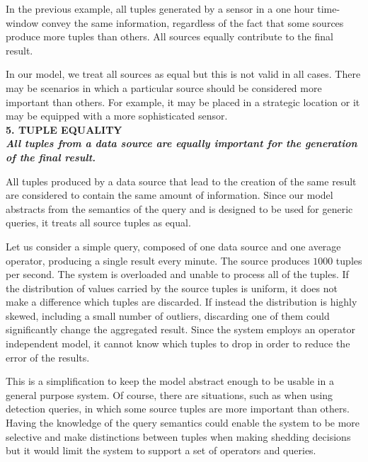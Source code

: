 	In the previous example, all tuples generated by a sensor in a one hour time-window convey the same
	information, regardless of the fact that some sources produce more tuples than others. All
	sources equally contribute to the final result.
	
	In our model, we treat all sources as equal but this is not valid in all cases. There may
	be scenarios in which a particular source should be considered more important than others. For
	example, it may be placed in a strategic location or it may be equipped with a more
	sophisticated sensor. \\
 
\textbf{5. TUPLE EQUALITY \\ \textit{All tuples from a data source are equally important for the generation
of the final result.}}

	All tuples produced by a data source that lead to the creation of the same result are considered to contain
	the same amount of information. Since our model abstracts from the semantics of the query and is
	designed to be used for generic queries, it treats all source tuples as equal. 
	
Let us consider a simple query, composed of one data source and one average operator, producing a single
result every minute. The source produces $1000$ tuples per second. The system is overloaded and unable
to process all of the tuples. If the distribution of values carried by the source tuples is uniform, it
does not make a difference which tuples are discarded. If instead the distribution is highly skewed,
including a small number of outliers, discarding one of them could significantly change the aggregated
result. Since the system employs an operator independent model, it cannot know which tuples to drop in
order to reduce the error of the results. 
	
This is a simplification to keep the model abstract enough to be usable in a general purpose system. Of
course, there are situations, such as when using detection queries, in which some source tuples are more
important than others. Having the knowledge of the query semantics could enable the system to be more
selective and make distinctions between tuples when making shedding decisions but it would limit the
system to support a set of operators and queries.
	
